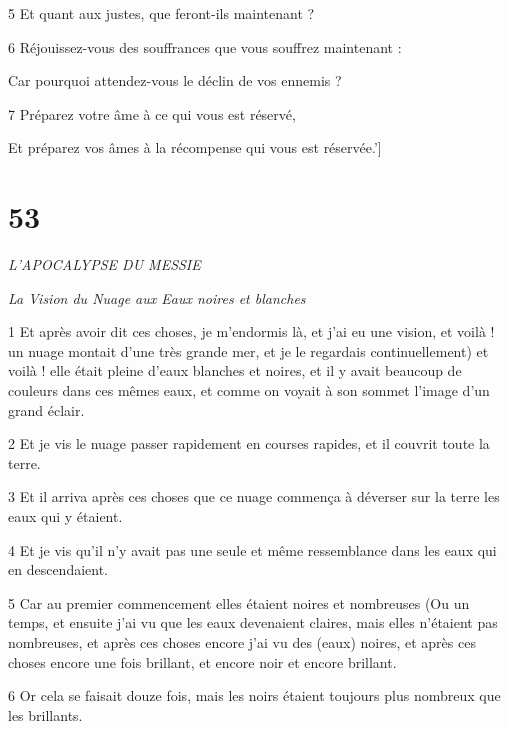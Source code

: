 \par 5 Et quant aux justes, que feront-ils maintenant ?

\par 6 Réjouissez-vous des souffrances que vous souffrez maintenant :

\par Car pourquoi attendez-vous le déclin de vos ennemis ?

\par 7 Préparez votre âme à ce qui vous est réservé,

\par Et préparez vos âmes à la récompense qui vous est réservée.']

\chapter{53}

\par \textit{L'APOCALYPSE DU MESSIE}

\par \textit{La Vision du Nuage aux Eaux noires et blanches}


\par 1 Et après avoir dit ces choses, je m'endormis là, et j'ai eu une vision, et voilà ! un nuage montait d'une très grande mer, et je le regardais continuellement) et voilà ! elle était pleine d'eaux blanches et noires, et il y avait beaucoup de couleurs dans ces mêmes eaux, et comme on voyait à son sommet l'image d'un grand éclair.

\par 2 Et je vis le nuage passer rapidement en courses rapides, et il couvrit toute la terre.

\par 3 Et il arriva après ces choses que ce nuage commença à déverser sur la terre les eaux qui y étaient.

\par 4 Et je vis qu'il n'y avait pas une seule et même ressemblance dans les eaux qui en descendaient.

\par 5 Car au premier commencement elles étaient noires et nombreuses (Ou un temps, et ensuite j'ai vu que les eaux devenaient claires, mais elles n'étaient pas nombreuses, et après ces choses encore j'ai vu des (eaux) noires, et après ces choses encore une fois brillant, et encore noir et encore brillant.

\par 6 Or cela se faisait douze fois, mais les noirs étaient toujours plus nombreux que les brillants.

